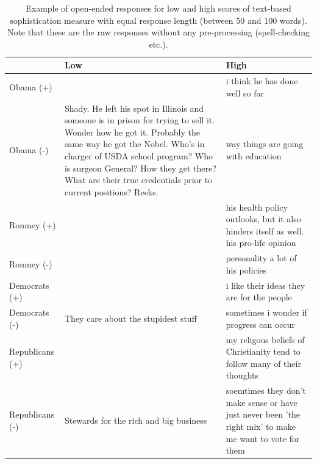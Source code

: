 \documentclass[12pt]{article}
\begin{document}
\begin{table}\footnotesize\centering
\begin{tabular}[ht]{lp{7cm}p{7cm}}
   \toprule
  & Low & High \\ 
   \midrule
   Obama (+) &  & i think he has done well so far \\ 
   Obama (-) & Shady. He left his spot in Illinois and someone is in prison for trying to sell it. Wonder how he got it. Probably the same way he got the Nobel. Who's in charger of USDA school program? Who is surgeon General? How they get there? What are their true credentials prior to current positions? Reeks. & way things are going with education \\ 
   Romney (+) &  & his health policy outlooks, but it also hinders itself as well. his pro-life opinion \\ 
   Romney (-) &  & personality a lot of his policies \\ 
   Democrats (+) &  & i like their ideas they are for the people \\ 
   Democrats (-) & They care about the stupidest stuff & sometimes i wonder if progress can occur \\ 
   Republicans (+) &  & my religous beliefs of Christianity tend to follow many of their thoughts \\ 
   Republicans (-) & Stewards for the rich and big business & soemtimes they don't make sense or have just never been 'the right mix' to make me want to vote for them \\ 
    \bottomrule
    \end{tabular}
  \caption{Example of open-ended responses for low and high scores of text-based sophistication measure with equal response length (between 50 and 100 words). Note that these are the raw responses without any pre-processing (spell-checking etc.).}
  \end{table}
\end{document}
